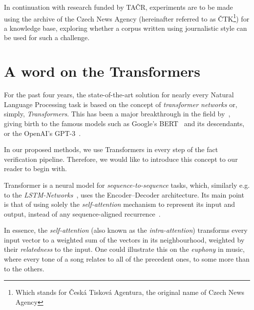 In continuation with research funded by \textsf{TAČR}, experiments are to be made using the archive of the \textsf{Czech News Agency} (hereinafter referred to as \textsf{ČTK}\footnote{Which stands for \"{\textsf{Česká Tisková Agentura}}, the original name of \textsf{Czech News Agency}}) for a knowledge base, exploring whether a corpus written using journalistic style can be used for such a challenge.



\section{A word on the Transformers}
\label{sec:transformers}
For the past four years, the state-of-the-art solution for nearly every Natural Language Processing task is based on the concept of \textit{transformer networks} or, simply, \textit{Transformers}. This has been a major breakthrough in the field by~\cite{vaswani}, giving birth to the famous models such as \textsf{Google}'s \textsf{BERT}~\cite{bert} and its descendants, or the \textsf{OpenAI}'s \textsf{GPT-3}~\cite{gpt3}.

In our proposed methods, we use Transformers in every step of the fact verification pipeline. Therefore, we would like to introduce this concept to our reader to begin with. 

Transformer is a neural model for \textit{sequence-to-sequence} tasks, which, similarly e.g. to the \textit{LSTM-Networks}~\cite{lstm}, uses the Encoder--Decoder architecture. Its main point is that of using solely the \textit{self-attention} mechanism to represent its input and output, instead of any sequence-aligned recurrence~\cite{vaswani}.

In essence, the \textit{self-attention} (also known as the \textit{intra-attention}) transforms every input vector to a weighted sum of the vectors in its neighbourhood, weighted by their \textit{relatedness} to the input. One could illustrate this on the \textit{euphony} in music, where every tone of a song relates to all of the precedent ones, to some more than to the others.

